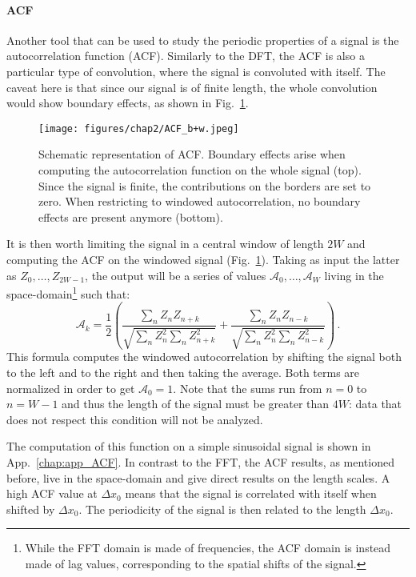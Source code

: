 \paragraph{ACF}
Another tool that can be used to study the periodic properties of a signal is the autocorrelation function (ACF). Similarly to the DFT, the ACF is also a particular type of convolution, where the signal is convoluted with itself. The caveat here is that since our signal is of finite length, the whole convolution would show boundary effects, as shown in Fig.\ \ref{fig:ACF_b+w}.
\begin{figure}[ht!]
    \centering
    \texttt{[image: figures/chap2/ACF\_b+w.jpeg]}
    \caption{Schematic representation of ACF. Boundary effects arise when computing the autocorrelation function on the whole signal (top). Since the signal is finite, the contributions on the borders are set to zero. When restricting to windowed autocorrelation, no boundary effects are present anymore (bottom).}
    \label{fig:ACF_b+w}
\end{figure}
It is then worth limiting the signal in a central window of length $2W$ and computing the ACF on the windowed signal (Fig.\ \ref{fig:ACF_b+w}). Taking as input the latter as $Z_0,\dots,Z_{2W-1}$, the output will be a series of values $\mathcal{A}_0,\dots,\mathcal{A}_{W}$ living in the space-domain\footnote{While the FFT domain is made of frequencies, the ACF domain is instead made of lag values, corresponding to the spatial shifts of the signal.} such that:
\begin{equation*}
    \mathcal{A}_k = \frac{1}{2} \left( \frac{\sum_{n} Z_n Z_{n+k}}{\sqrt{\sum_{n} Z_n^2 \sum_{n} Z_{n+k}^2}} + \frac{\sum_{n} Z_n Z_{n-k}}{\sqrt{\sum_{n} Z_n^2 \sum_{n} Z_{n-k}^2}} \right)\, .
\end{equation*}
This formula computes the windowed autocorrelation by shifting the signal both to the left and to the right and then taking the average.
Both terms are normalized in order to get $\mathcal{A}_0 = 1$. 
Note that the sums run from $n = 0$ to $n = W-1$ and thus the length of the signal must be greater than $4W$: data that does not respect this condition will not be analyzed.

The computation of this function on a simple sinusoidal signal is shown in App.\ \ref{chap:app_ACF}. In contrast to the FFT, the ACF results, as mentioned before, live in the space-domain and give direct results on the length scales. A high ACF value at $\Delta x_0$ means that the signal is correlated with itself when shifted by $\Delta x_0$. The periodicity of the signal is then related to the length $\Delta x_0$.

